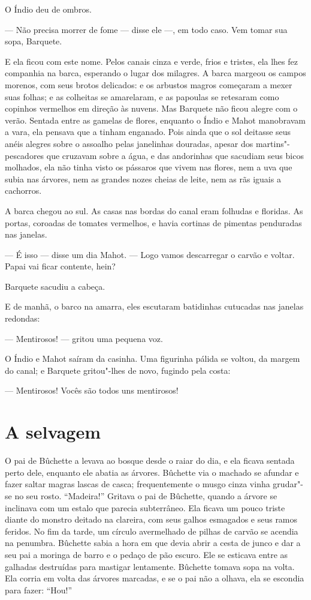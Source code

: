 O Índio deu de ombros.

--- Não precisa morrer de fome --- disse ele ---, em todo caso.  Vem tomar sua
sopa, Barquete.

E ela ficou com este nome. Pelos canais cinza e verde, frios e tristes,
ela lhes fez companhia na barca, esperando o lugar dos milagres. A barca
margeou os campos morenos, com seus brotos delicados: e os arbustos magros
começaram a mexer suas folhas; e as colheitas se amarelaram, e as
papoulas se retesaram como copinhos vermelhos em direção às nuvens. Mas
Barquete não ficou alegre com o verão. Sentada entre as gamelas de flores,
enquanto o Índio e Mahot manobravam a vara, ela pensava que a tinham
enganado. Pois ainda que o sol deitasse seus anéis alegres sobre o
assoalho pelas janelinhas douradas, apesar dos martins"-pescadores que
cruzavam sobre a água, e das andorinhas que sacudiam seus bicos molhados,
ela não tinha visto os pássaros que vivem nas flores, nem a uva que subia
nas árvores, nem as grandes nozes cheias de leite, nem as rãs iguais
a cachorros.

A barca chegou ao sul. As casas nas bordas do canal eram folhudas e
floridas. As portas, coroadas de tomates vermelhos, e havia cortinas de
pimentas penduradas nas janelas.

--- É isso --- disse um dia Mahot. --- Logo vamos descarregar o carvão e
voltar. Papai vai ficar contente, hein?

Barquete sacudiu a cabeça.

E de manhã, o barco na amarra, eles escutaram batidinhas cutucadas nas
janelas redondas:

--- Mentirosos! --- gritou uma pequena voz.

O Índio e Mahot saíram da casinha. Uma figurinha pálida se voltou,
da margem do canal; e Barquete gritou"-lhes de novo, fugindo pela
costa:

--- Mentirosos! Vocês são todos uns mentirosos!

\section*{A selvagem}

O pai de Bûchette a levava ao bosque desde o raiar do dia, e ela ficava
sentada perto dele, enquanto ele abatia as árvores. Bûchette via o machado
se afundar e fazer saltar magras lascas de casca; frequentemente o musgo
cinza vinha grudar"-se no seu rosto. “Madeira!” Gritava o pai de Bûchette,
quando a árvore se inclinava com um estalo que parecia subterrâneo. Ela
ficava um pouco triste diante do monstro deitado na clareira, com seus
galhos esmagados e seus ramos feridos. No fim da tarde, um círculo avermelhado de
pilhas de carvão se acendia na penumbra. Bûchette sabia a hora em que
devia abrir a cesta de junco e dar a seu pai a moringa de barro e o pedaço
de pão escuro. Ele se esticava entre as galhadas destruídas para mastigar
lentamente. Bûchette tomava sopa na volta. Ela corria em volta das árvores
marcadas, e se o pai não a olhava, ela se escondia para fazer: “Hou!”


